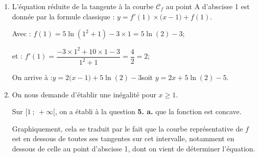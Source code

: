 \begin{enumerate}
\begin{enumerate}
$f$ est donc convexe sur $[-1 ; 1]$, et concave sur $]-\infty ; -1]$ ainsi que sur $[1 ; +\infty[$, avec deux points d'inflexion, à l'abscisse $-1$ et à l'abscisse 1(c'est le point A).

Cela permet donc de rejeter la conjecture formulée à la question \textbf{1.}. Cette conjecture est faussée par l'échelle choisie pour la représentation de $f$. Ci-après, avec une échelle qui permet d'observer les images pour des abscisses inférieures à 1, la concavité de cette zone devient apparente :

\hfill~\hfill~

	\item L'équation réduite de la tangente à la courbe $\mathcal{C}_{f}$ au point A d'abscisse 1 est donnée par la formule classique :
\quad $y = f'(1) \times \big(x - 1\big) + f(1)$.

Avec : \quad $f(1) = 5\ln(1^2 + 1) - 3\times 1 = 5\ln(2) - 3$;

et : \quad $f'(1) = \dfrac{-3\times 1^2 + 10 \times 1 - 3}{1^2 + 1} = \dfrac{4}{2} = 2$;

On arrive à :\quad $y = 2\big(x - 1\big) + 5\ln(2) - 3$\quad soit  \quad $y = 2x + 5\ln(2) - 5$.

	\item On nous demande d'établir une inégalité pour $x \geqslant 1$.

Sur $[1~;~+\infty[$, on a établi à la question \textbf{5. a.} que la fonction est concave.

Graphiquement, cela se traduit par le fait que la courbe représentative de $f$ est en dessous de toutes ses tangentes sur cet intervalle, notamment en dessous de celle au point d'abscisse 1, dont on vient de déterminer l'équation.


\end{enumerate}
\end{enumerate}
